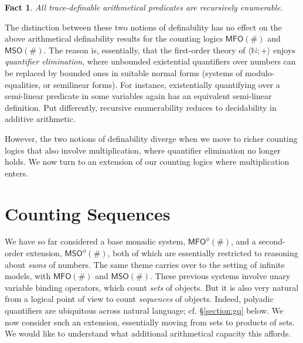 \documentclass[12pt,oneside,reqno]{amsart}
\newtheorem{fact}{Fact}
\theoremstyle{definition}
\begin{document}
\begin{fact} All trace-definable arithmetical predicates are recursively enumerable.  \label{fact2} \end{fact}

The distinction between these two notions of definability has no effect on the above arithmetical definability results for the counting logics $\mathsf{MFO}(\#)$ and $\mathsf{MSO}(\#)$. The reason is, essentially, that the first-order theory of  $\langle\mathbb{N};+\rangle$ enjoys \emph{quantifier elimination}, where unbounded existential quantifiers over numbers can be replaced by bounded ones in suitable normal forms (systems of modulo-equalities, or semilinear forms). For instance, existentially quantifying over a semi-linear predicate in some variables again has an equivalent semi-linear definition. Put differently, recursive enumerability reduces to decidability in additive arithmetic. 

However, the two notions of definability diverge when we move to richer counting logics that also involve multiplication, where quantifier elimination no longer holds. We now turn to an extension of our counting logics where multiplication enters.



\section{Counting Sequences} \label{section:sequences} We have so far considered a base monadic system, $\mathsf{MFO}^\phi(\#)$, and a second-order extension, $\mathsf{MSO}^\phi(\#)$, both of which are essentially restricted to reasoning about \emph{sums} of numbers. The same theme carries over to the setting of infinite models, with $\mathsf{MFO}(\#)$ and $\mathsf{MSO}(\#)$. 
These previous systems involve unary variable binding operators, which count \emph{sets} of objects. But it is also very natural from a logical point of view to count \emph{sequences} of objects. Indeed, polyadic quantifiers are  ubiquitous across natural language; cf. \S\ref{section:gq} below. We now consider such an extension, essentially moving from sets to products of sets. We would like to understand what additional arithmetical capacity this affords. 
\end{document}
